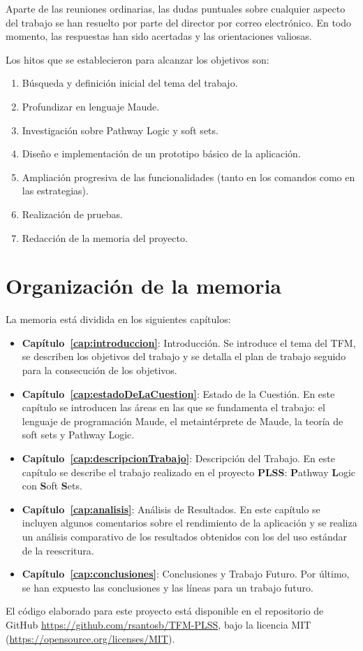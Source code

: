 Aparte de las reuniones ordinarias, las dudas puntuales sobre cualquier aspecto del trabajo se han resuelto por parte del director por correo electrónico.
En todo momento, las respuestas han sido acertadas y las orientaciones valiosas.
\smallskip

Los hitos que se establecieron para alcanzar los objetivos son:
\begin{enumerate}
\item Búsqueda y definición inicial del tema del trabajo.
\item Profundizar en lenguaje Maude.
\item Investigación sobre Pathway Logic y soft sets.
\item Diseño e implementación de un prototipo básico de la aplicación.
\item Ampliación progresiva de las funcionalidades (tanto en los comandos como en las estrategias).
\item Realización de pruebas. 
\item Redacción de la memoria del proyecto.
\end{enumerate}


\section{Organización de la memoria}

La memoria está dividida en los siguientes capítulos:

\begin{itemize}
\item \textbf{Capítulo~\ref{cap:introduccion}}: Introducción. 
Se introduce el tema del TFM, se describen los objetivos del trabajo y se detalla el plan de trabajo seguido para la consecución de los objetivos.

\item \textbf{Capítulo~\ref{cap:estadoDeLaCuestion}}: Estado de la Cuestión. 
En este capítulo se introducen las áreas en las que se fundamenta el trabajo: el lenguaje de programación Maude, el metaintérprete de Maude, la teoría de soft sets y Pathway Logic.

\item \textbf{Capítulo~\ref{cap:descripcionTrabajo}}: Descripción del Trabajo.
En este capítulo se describe el trabajo realizado en el proyecto \textbf{PLSS}: \textbf{P}athway \textbf{L}ogic con \textbf{S}oft \textbf{S}ets.

\item \textbf{Capítulo~\ref{cap:analisis}}: Análisis de Resultados.
En este capítulo se incluyen algunos comentarios sobre el rendimiento de la aplicación y se realiza un análisis comparativo de los resultados obtenidos con los del uso estándar de la reescritura.

\item \textbf{Capítulo~\ref{cap:conclusiones}}: Conclusiones y Trabajo Futuro.
Por último, se han expuesto las conclusiones y las líneas para un trabajo futuro.
\end{itemize}
\medskip

El código elaborado para este proyecto está disponible en el repositorio de GitHub
\url{https://github.com/rsantosb/TFM-PLSS}, bajo la licencia MIT (\url{https://opensource.org/licenses/MIT}).

